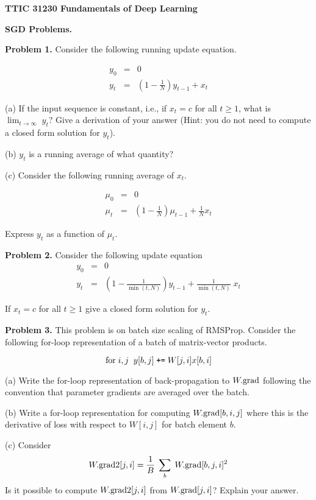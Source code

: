 \documentclass{article}
\begin{document}
\centerline{\bf TTIC 31230 Fundamentals of Deep Learning}
\bigskip
\centerline{\bf SGD Problems.}

\bigskip
\bigskip
{\bf Problem 1.} Consider the following running update equation.

\begin{eqnarray*}
  y_0  & = & 0 \\
  y_t & = & \left(1 - \frac{1}{N}\right)y_{t-1} + x_t
\end{eqnarray*}

(a) If the input sequence is constant, i.e., if $x_t = c$ for all $t \geq 1$, what is $\lim_{t \rightarrow \infty}\;y_t$?  Give a derivation of your answer
(Hint: you do not need to compute a closed form solution for $y_t$).

\medskip
(b) $y_t$ is a running average of what quantity?

\medskip
(c) Consider the following running average of $x_t$.

\begin{eqnarray*}
  \mu_0  & = & 0 \\
  \mu_t & = & \left(1 - \frac{1}{N}\right)\mu_{t-1} + \frac{1}{N}x_t
\end{eqnarray*}

Express $y_t$ as a function of $\mu_t$.

\bigskip
{\bf Problem 2.}
Consider the following update equation
\begin{eqnarray*}
  y_0  & = & 0 \\
  y_t & = & \left(1 - \frac{1}{\min(t,N)}\right)y_{t-1} + \frac{1}{\min(t,N)}\;x_t
\end{eqnarray*}

If $x_t = c$ for all $t \geq 1$ give a closed form solution for $y_t$.

\bigskip
{\bf Problem 3.} This problem is on batch size scaling of RMSProp.  Consider the following for-loop representation of a batch of matrix-vector products.

$$\mbox{for}\;i,j\;\;y[b,j] \;\mbox{\tt +=}\; W[j,i]x[b,i]$$

(a) Write the for-loop representation of back-propagation to $W.\mathrm{grad}$ following the convention that parameter gradients are averaged over the batch.

\medskip
(b) Write a for-loop representation for computing $W.\mathrm{grad}[b,i,j]$ where this is the derivative of loss with respect to $W[i,j]$ for batch element $b$.

\medskip
(c) Consider
$$W.\mathrm{grad}2[j,i] = \frac{1}{B} \;\sum_b\; W.\mathrm{grad}[b,j,i]^2$$
Is it possible to compute $W.\mathrm{grad}2[j,i]$ from $W.\mathrm{grad}[j,i]$? Explain your answer.
\end{document}
